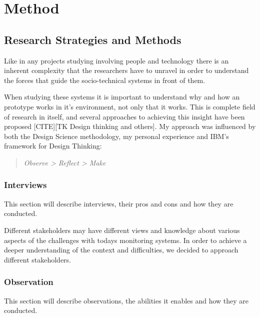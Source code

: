 \section{Method} %
\label{sec:method}


\subsection{Research Strategies and Methods} %
\label{sub:research_strategies_and_methods}


Like in any projects studying involving people and technology there is an inherent complexity that the researchers have to unravel in order to understand the forces that guide the socio-technical systems in front of them.

When studying these systems it is important to understand why and how an prototype works in it's environment, not only that it works. This is complete field of research in itself, and several approaches to achieving this insight have been proposed [CITE][TK Design thinking and others]. My approach was influenced by both the Design Science methodology, my personal experience and IBM's framework for Design Thinking: 

\begin{quote} 
\textit{Observe > Reflect > Make}
\end{quote}

\subsubsection{Interviews} %
\label{ssub:interviews}

This section will describe interviews, their pros and cons and how they are conducted.

Different stakeholders may have different views and knowledge about various aspects of the challenges with todays monitoring systems. In order to achieve a deeper understanding of the context and difficulties, we decided to approach different stakeholders.


\subsubsection{Observation} %
\label{ssub:observation}

This section will describe observations, the abilities it enables and how they are conducted.

